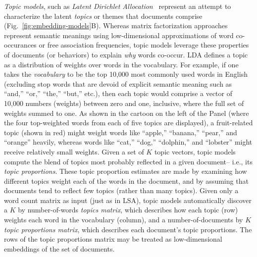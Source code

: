 \documentclass{article}
\begin{document}
\textit{Topic models}, such as \textit{Latent Dirichlet Allocation}~\citep[LDA;][]{BleiEtal03} represent an attempt to characterize the latent \textit{topics} or themes that documents comprise (Fig.~\ref{fig:embedding-models}B).  Whereas matrix factorization approaches represent semantic meanings using low-dimensional approximations of word co-occurances or free association frequencies, topic models leverage these properties of documents (or behaviors) to explain \textit{why} words co-occur.  LDA defines a topic as a distribution of weights over words in the vocabulary.  For example, if one takes the \textit{vocabulary} to be the top 10,000 most commonly used words in English (excluding stop words that are devoid of explicit semantic meaning such as ``and,'' ``or,'' ``the,'' ``but,'' etc.), then each topic would comprise a vector of 10,000 numbers (weights) between zero and one, inclusive, where the full set of weights summed to one.  As shown in the cartoon on the left of the Panel (where the four top-weighted words from each of five topics are displayed), a fruit-related topic (shown in red) might weight words like ``apple,'' ``banana,'' ``pear,'' and ``orange'' heavily, whereas words like ``cat,'' ``dog,'' ``dolphin,'' and ``lobster'' might receive relatively small weights.  Given a set of $K$ topic vectors, topic models compute the blend of topics most probably reflected in a given document-- i.e., its \textit{topic proportions}.  These topic proportion estimates are made by examining how different topics weight each of the words in the document, and by assuming that documents tend to reflect few topics (rather than many topics).  Given only a word count matrix as input (just as in LSA), topic models automatically discover a $K$ by number-of-words \textit{topics matrix}, which describes how each topic (row) weights each word in the vocabulary (column), and a number-of-documents by $K$ \textit{topic proportions matrix}, which describes each document's topic proportions.  The rows of the topic proportions matrix may be treated as low-dimensional embeddings of the set of documents.
\end{document}
